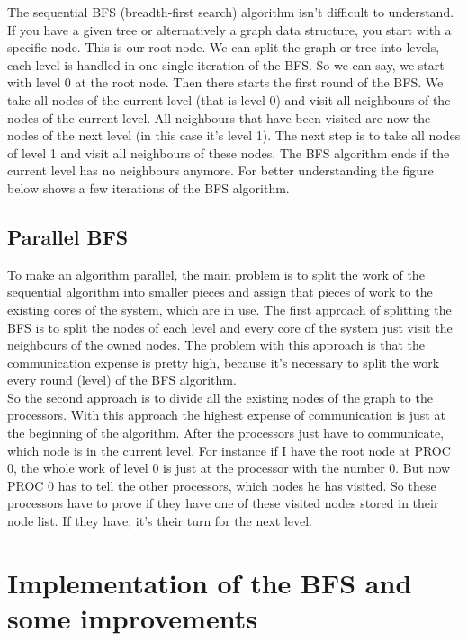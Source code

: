 \documentclass[11pt,a4paper]{article}
\begin{document}
The sequential BFS (breadth-first search) algorithm isn't difficult to understand. If you have a given tree or alternatively a graph data structure, you start with a specific node. This is our root node. We can split the graph or tree into levels, each level is handled in one single iteration of the BFS. So we can say, we start with level 0 at the root node.
Then there starts the first round of the BFS. We take all nodes of the current level (that is level 0) and visit all neighbours of the nodes of the current level. All neighbours that have been visited are now the nodes of the next level (in this case it's level 1). The next step is to take all nodes of level 1 and visit all neighbours of these nodes. The BFS algorithm ends if the current level has no neighbours anymore. For better understanding the figure below shows a few iterations of the BFS algorithm.

\subsection{Parallel BFS}
\label{sec:parallel-bfs}

To make an algorithm parallel, the main problem is to split the work of the sequential algorithm into smaller pieces and assign that pieces of work to the existing cores of the system, which are in use. 
The first approach of splitting the BFS is to split the nodes of each level and every core of the system just visit the neighbours of the owned nodes. The problem with this approach is that the communication expense is pretty high, because it's necessary to split the work every round (level) of the BFS algorithm.\\
So the second approach is to divide all the existing nodes of the graph to the processors. With this approach the highest expense of communication is just at the beginning of the algorithm. After the processors just have to communicate, which node is in the current level. For instance if I have the root node at PROC 0, the whole work of level 0 is just at the processor with the number 0. But now PROC 0 has to tell the other processors, which nodes he has visited. So these processors have to prove if they have one of these visited nodes stored in their node list. If they have, it's their turn for the next level.

\section{Implementation of the BFS and some improvements}
\label{sec:implementations}
\end{document}
